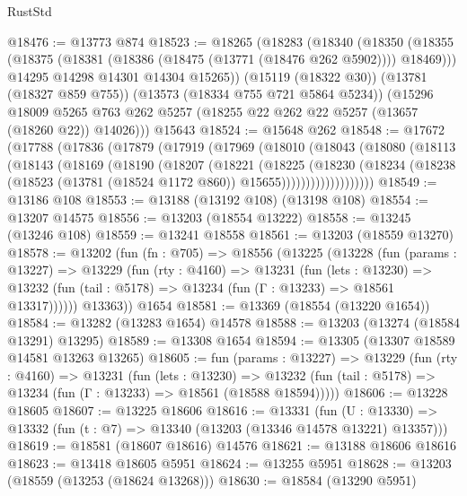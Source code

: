 \begin{lexlean}{RustStd}
\begin{coremodule}
@18476 := @13773 @874
@18523 := @18265
    (@18283
      (@18340
        (@18350
          (@18355 (@18375 (@18381 (@18386 (@18475 (@13771 (@18476 @262 @5902)))) @18469)))
          @14295
          @14298
          @14301
          @14304
          @15265))
      (@15119 (@18322 @30))
      (@13781 (@18327 @859 @755))
      (@13573 (@18334 @755 @721 @5864 @5234))
      (@15296
        @18009
        @5265
        @763
        @262
        @5257
        (@18255 @22 @262 @22 @5257 (@13657 (@18260 @22)) @14026)))
    @15643
@18524 := @15648 @262
@18548 := @17672
    (@17788
      (@17836
        (@17879
          (@17919
            (@17969
              (@18010
                (@18043
                  (@18080
                    (@18113
                      (@18143
                        (@18169
                          (@18190
                            (@18207
                              (@18221
                                (@18225
                                  (@18230
                                    (@18234
                                      (@18238
                                        (@18523
                                          (@13781 (@18524 @1172 @860))
                                          @15655)))))))))))))))))))
@18549 := @13186 @108
@18553 := @13188 (@13192 @108) (@13198 @108)
@18554 := @13207 @14575
@18556 := @13203 (@18554 @13222)
@18558 := @13245 (@13246 @108)
@18559 := @13241 @18558
@18561 := @13203 (@18559 @13270)
@18578 := @13202
    (fun (fn : @705) =>
    @18556
      (@13225
        (@13228
          (fun (params : @13227) =>
          @13229
            (fun (rty : @4160) =>
            @13231
              (fun (lets : @13230) =>
              @13232 (fun (tail : @5178) => @13234 (fun (Γ : @13233) => @18561 @13317))))))
        @13363))
    @1654
@18581 := @13369 (@18554 (@13220 @1654))
@18584 := @13282 (@13283 @1654) @14578
@18588 := @13203 (@13274 (@18584 @13291) @13295)
@18589 := @13308 @1654
@18594 := @13305 (@13307 @18589 @14581 @13263 @13265)
@18605 := fun (params : @13227) =>
  @13229
    (fun (rty : @4160) =>
    @13231
      (fun (lets : @13230) =>
      @13232 (fun (tail : @5178) => @13234 (fun (Γ : @13233) => @18561 (@18588 @18594)))))
@18606 := @13228 @18605
@18607 := @13225 @18606
@18616 := @13331
    (fun (U : @13330) => @13332 (fun (t : @7) => @13340 (@13203 (@13346 @14578 @13221) @13357)))
@18619 := @18581 (@18607 @18616) @14576
@18621 := @13188 @18606 @18616
@18623 := @13418 @18605 @5951
@18624 := @13255 @5951
@18628 := @13203 (@18559 (@13253 (@18624 @13268)))
@18630 := @18584 (@13290 @5951)

\end{coremodule}
\end{lexlean}
